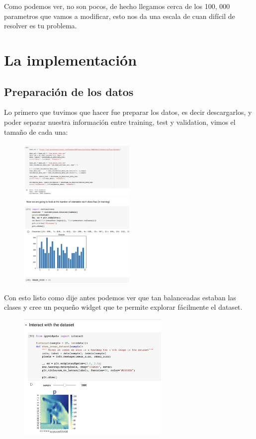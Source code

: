 \documentclass[12pt, fleqn]{report}                             %
\theoremstyle{break}                                            %
\begin{document}
        Como podemos ver, no son pocos, de hecho llegamos cerca de los 100, 000 parametros que vamos a modificar, esto nos da
        una escala de cuan difícil de resolver es tu problema.

    \chapter{La implementación}

        \section{Preparación de los datos}

        Lo primero que tuvimos que hacer fue preparar los datos, es decir descargarlos, y poder separar nuestra información
        entre training, test y validation, vimos el tamaño de cada una:

        \begin{figure}[h!]
            \includegraphics[width=0.5\textwidth]{1}
            \includegraphics[width=0.5\textwidth]{2}
        \end{figure}

        \clearpage

        Con esto listo como dije antes podemos ver que tan balanceadas estaban las clases y cree un pequeño widget
        que te permite explorar fácilmente el dataset.

        \begin{figure}[h!]
            \includegraphics[width=0.65\textwidth]{3}
        \end{figure}
\end{document}
